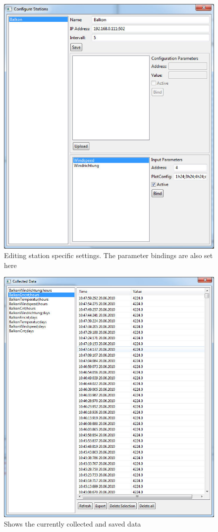 \begin{figure}[p]
    \centering
    \includegraphics[width=0.8\linewidth]{master/stations.jpg}
    \caption{Editing station specific settings. The parameter bindings are also set here}
    \label{fig:stations}
\end{figure}

\begin{figure}[p]
    \centering
    \includegraphics[width=0.8\linewidth]{master/viewdata.jpg}
    \caption{Shows the currently collected and saved data}
    \label{fig:data}
\end{figure}
\newpage
